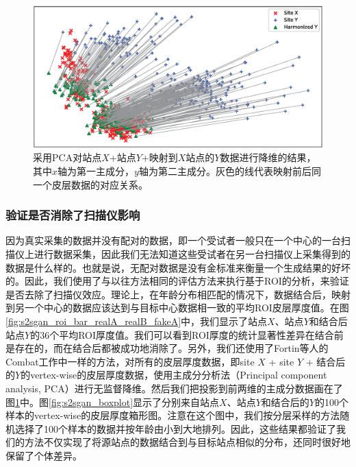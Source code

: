 \begin{figure}[t]
\centering
\includegraphics[width=\linewidth]{figure/s2sgan_pca.eps}
\caption{采用PCA对站点$X$+站点$Y$+映射到$X$站点的$Y$数据进行降维的结果，其中$x$轴为第一主成分，$y$轴为第二主成分。灰色的线代表映射前后同一个皮层数据的对应关系。}\label{fig:s2sgan_pca} 
\end{figure} 

\subsubsection{验证是否消除了扫描仪影响}
因为真实采集的数据并没有配对的数据，即一个受试者一般只在一个中心的一台扫描仪上进行数据采集，因此我们无法知道这些受试者在另一台扫描仪上采集得到的数据是什么样的。也就是说，无配对数据是没有金标准来衡量一个生成结果的好坏的。因此，我们使用了与以往方法\cite{karayumak2019retrospective}相同的评估方法来执行基于ROI的分析，来验证是否去除了扫描仪效应。理论上，在年龄分布相匹配的情况下，数据结合后，映射到另一个中心的数据应该达到与目标中心数据相一致的平均ROI皮层厚度值。在图\ref{fig:s2sgan_roi_bar_realA_realB_fakeA}中，我们显示了站点$X$、站点$Y$和结合后站点$Y$的36个平均ROI厚度值。我们可以看到ROI厚度的统计显著性差异在结合前是存在的，而在结合后都被成功地消除了。另外，我们还使用了Fortin等人的Combat\cite{fortin2018harmonization}工作中一样的方法，对所有的皮层厚度数据，即site $X$ + site $Y$ + 结合后的$Y$的vertex-wise的皮层厚度数据，使用主成分分析法（Principal component analysis, PCA）进行无监督降维。然后我们把投影到前两维的主成分数据画在了图\ref{fig:s2sgan_pca}中。图\ref{fig:s2sgan_boxplot}显示了分别来自站点$X$、站点$Y$和结合后的$Y$的100个样本的vertex-wise的皮层厚度箱形图。注意在这个图中，我们按分层采样的方法随机选择了100个样本的数据并按年龄由小到大地排列。因此，这些结果都验证了我们的方法不仅实现了将源站点的数据结合到与目标站点相似的分布，还同时很好地保留了个体差异。

